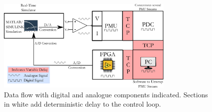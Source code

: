 \documentclass[conference]{IEEEtran}
\begin{document}
\begin{figure}[tbh]
\centering
\includegraphics[width=3.4in]{DataFlow.png}
\caption{Data flow with digital and analogue components indicated. Sections in white add deterministic delay to the control loop.}
\label{Data_path}
\end{figure}




\end{document}

